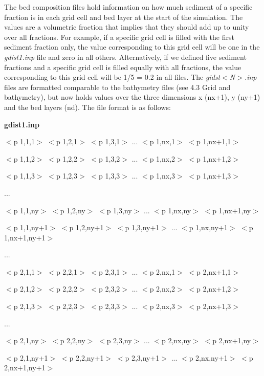 \documentclass{article}
\begin{document}
\noindent The bed composition files hold information on how much sediment of a specific fraction is in each grid cell and bed layer at the start of the simulation. The values are a volumetric fraction that implies that they should add up to unity over all fractions. For example, if a specific grid cell is filled with the first sediment fraction only, the value corresponding to this grid cell will be one in the \textit{gdist1.inp} file and zero in all others. Alternatively, if we defined five sediment fractions and a specific grid cell is filled equally with all fractions, the value corresponding to this grid cell will be 1/5 = 0.2 in all files. The \textit{gidst$<$N$>$.inp} files are formatted comparable to the bathymetry files (see 4.3 Grid and bathymetry), but now holds values over the three dimensions x (nx+1), y (ny+1) and the bed layers (nd). The file format is as follows:

\noindent \textbf{gdist1.inp}

\noindent $<$p 1,1,1$>$ $<$p 1,2,1$>$ $<$p 1,3,1$>$ ... $<$p 1,nx,1$>$ $<$p 1,nx+1,1$>$

\noindent $<$p 1,1,2$>$ $<$p 1,2,2$>$ $<$p 1,3,2$>$ ... $<$p 1,nx,2$>$ $<$p 1,nx+1,2$>$

\noindent $<$p 1,1,3$>$ $<$p 1,2,3$>$ $<$p 1,3,3$>$ ... $<$p 1,nx,3$>$ $<$p 1,nx+1,3$>$

\noindent ...

\noindent $<$p 1,1,ny$>$ $<$p 1,2,ny$>$ $<$p 1,3,ny$>$ ... $<$p 1,nx,ny$>$ $<$p 1,nx+1,ny$>$

\noindent $<$p 1,1,ny+1$>$ $<$p 1,2,ny+1$>$ $<$p 1,3,ny+1$>$ ... $<$p 1,nx,ny+1$>$ $<$p 1,nx+1,ny+1$>$

\noindent 

\noindent ...

\noindent 

\noindent $<$p 2,1,1$>$ $<$p 2,2,1$>$ $<$p 2,3,1$>$ ... $<$p 2,nx,1$>$ $<$p 2,nx+1,1$>$

\noindent $<$p 2,1,2$>$ $<$p 2,2,2$>$ $<$p 2,3,2$>$ ... $<$p 2,nx,2$>$ $<$p 2,nx+1,2$>$

\noindent $<$p 2,1,3$>$ $<$p 2,2,3$>$ $<$p 2,3,3$>$ ... $<$p 2,nx,3$>$ $<$p 2,nx+1,3$>$

\noindent ...

\noindent $<$p 2,1,ny$>$ $<$p 2,2,ny$>$ $<$p 2,3,ny$>$ ... $<$p 2,nx,ny$>$ $<$p 2,nx+1,ny$>$

\noindent $<$p 2,1,ny+1$>$ $<$p 2,2,ny+1$>$ $<$p 2,3,ny+1$>$ ... $<$p 2,nx,ny+1$>$ $<$p 2,nx+1,ny+1$>$
\end{document}

